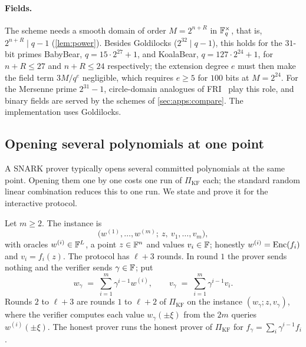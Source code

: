 \paragraph{Fields.}
The scheme needs a smooth domain of order $M = 2^{n+R}$ in $\mathbb{F}_q^\times$, that is, $2^{n+R} \mid q - 1$ (\cref{lem:power}).
Besides Goldilocks ($2^{32} \mid q-1$), this holds for the $31$-bit primes BabyBear, $q = 15 \cdot 2^{27} + 1$, and KoalaBear, $q = 127 \cdot 2^{24} + 1$, for $n + R \le 27$ and $n + R \le 24$ respectively; the extension degree $e$ must then make the field term $3M/q^e$ negligible, which requires $e \ge 5$ for $100$ bits at $M = 2^{24}$.
For the Mersenne prime $2^{31}-1$, circle-domain analogues of FRI~\cite{HLP24} play this role, and binary fields are served by the schemes of \cref{sec:apps:compare}.
The implementation uses Goldilocks.

\subsection{Opening several polynomials at one point}\label{sec:apps:batch}

A SNARK prover typically opens several committed polynomials at the same point.
Opening them one by one costs one run of $\Pi_{\mathrm{KF}}$ each; the standard random linear combination reduces this to one run.
We state and prove it for the interactive protocol.

\begin{definition}\label{def:batch}
Let $m \ge 2$. The instance is
\[
  \bigl(w^{(1)}, \dots, w^{(m)};\ z,\ v_1, \dots, v_m\bigr),
\]
with oracles $w^{(i)} \in \mathbb{F}^L$, a point $z \in \mathbb{F}^n$ and values $v_i \in \mathbb{F}$; honestly $w^{(i)} = \mathrm{Enc}(f_i)$ and $v_i = f_i(z)$.
The protocol has $\ell + 3$ rounds.
In round $1$ the prover sends nothing and the verifier sends $\gamma \in \mathbb{F}$; put
\[
  w_\gamma \;=\; \sum_{i=1}^{m} \gamma^{i-1} w^{(i)}, \qquad v_\gamma \;=\; \sum_{i=1}^{m} \gamma^{i-1} v_i .
\]
Rounds $2$ to $\ell+3$ are rounds $1$ to $\ell+2$ of $\Pi_{\mathrm{KF}}$ on the instance $(w_\gamma; z, v_\gamma)$, where the verifier computes each value $w_\gamma(\pm\xi)$ from the $2m$ queries $w^{(i)}(\pm\xi)$.
The honest prover runs the honest prover of $\Pi_{\mathrm{KF}}$ for $f_\gamma = \sum_i \gamma^{i-1} f_i$.
\end{definition}

